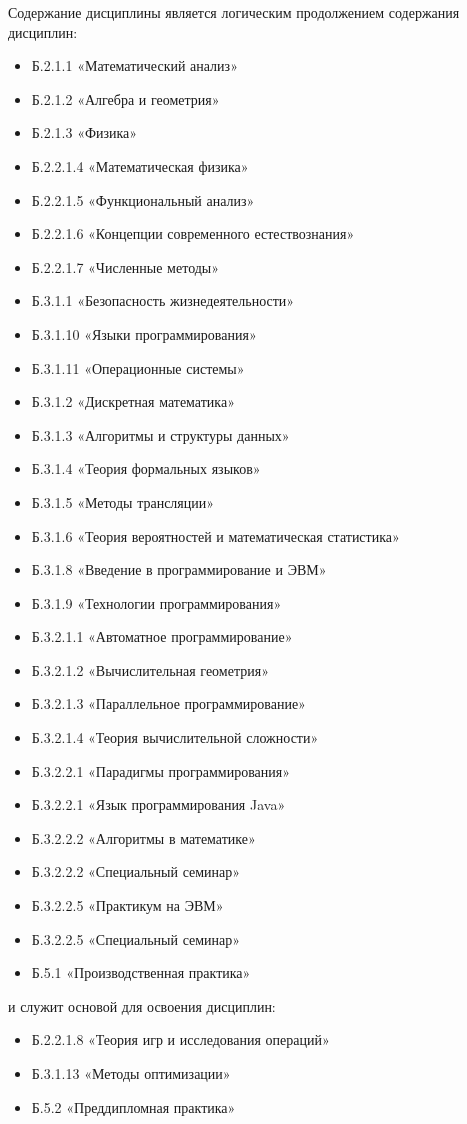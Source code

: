 \begin{center}
Содержание дисциплины является логическим продолжением содержания дисциплин: \begin{itemize}
\item Б.2.1.1 «Математический анализ»\item Б.2.1.2 «Алгебра и геометрия»\item Б.2.1.3 «Физика»\item Б.2.2.1.4 «Математическая физика»\item Б.2.2.1.5 «Функциональный анализ»\item Б.2.2.1.6 «Концепции современного естествознания»\item Б.2.2.1.7 «Численные методы»\item Б.3.1.1 «Безопасность жизнедеятельности»\item Б.3.1.10 «Языки программирования»\item Б.3.1.11 «Операционные системы»\item Б.3.1.2 «Дискретная математика»\item Б.3.1.3 «Алгоритмы и структуры данных»\item Б.3.1.4 «Теория формальных языков»\item Б.3.1.5 «Методы трансляции»\item Б.3.1.6 «Теория вероятностей и математическая статистика»\item Б.3.1.8 «Введение в программирование и ЭВМ»\item Б.3.1.9 «Технологии программирования»\item Б.3.2.1.1 «Автоматное программирование»\item Б.3.2.1.2 «Вычислительная геометрия»\item Б.3.2.1.3 «Параллельное программирование»\item Б.3.2.1.4 «Теория вычислительной сложности»\item Б.3.2.2.1 «Парадигмы программирования»\item Б.3.2.2.1 «Язык программирования Java»\item Б.3.2.2.2 «Алгоритмы в математике»\item Б.3.2.2.2 «Специальный семинар»\item Б.3.2.2.5 «Практикум на ЭВМ»\item Б.3.2.2.5 «Специальный семинар»\item Б.5.1 «Производственная практика»
\end{itemize} и служит основой для освоения дисциплин: \begin{itemize}
\item Б.2.2.1.8 «Теория игр и исследования операций»\item Б.3.1.13 «Методы оптимизации»\item Б.5.2 «Преддипломная практика»
\end{itemize}


\end{center}

